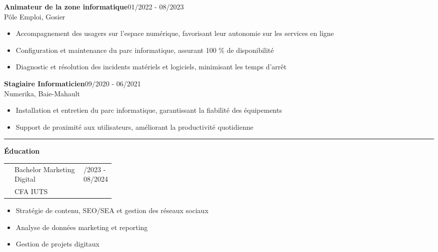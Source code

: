 \documentclass[a4paper]{article}
\renewcommand{\colorbox}[2]{#2}%
\newcommand{\fullrule}{\hspace{-1.5cm}\rule{\paperwidth}{0.4pt}}
\newcommand{\cvsection}[1]{%
  \vspace{6pt}\textbf{\Large #1}\par\vspace{2pt}}
\begin{document}
\vspace{3mm}

\colorbox{maincolor}{%
  \begin{minipage}{\linewidth}
    \noindent
    \textbf{Animateur de la zone informatique}\hfill 01/2022 - 08/2023\\
    Pôle Emploi, Gosier\\[-0.3em]
    \begin{itemize}[leftmargin=*]
      \item Accompagnement des usagers sur l’espace numérique, favorisant leur autonomie sur les services en ligne \item Configuration et maintenance du parc informatique, assurant 100 \% de disponibilité \item Diagnostic et résolution des incidents matériels et logiciels, minimisant les temps d’arrêt
    \end{itemize}
  \end{minipage}}

\vspace{3mm}

\colorbox{maincolor}{%
  \begin{minipage}{\linewidth}
    \noindent
    \textbf{Stagiaire Informaticien}\hfill 09/2020 - 06/2021\\
    Numerika, Baie-Mahault\\[-0.3em]
    \begin{itemize}[leftmargin=*]
      \item Installation et entretien du parc informatique, garantissant la fiabilité des équipements \item Support de proximité aux utilisateurs, améliorant la productivité quotidienne
    \end{itemize}
  \end{minipage}}

\medskip\fullrule

\cvsection{Éducation}
\hspace*{1.3cm}%

\begin{tabularx}{\linewidth}{@{}c  >{\RaggedRight\arraybackslash}X
                             >{\raggedleft\arraybackslash}p{0.25\linewidth}@{}}
\textcolor{sidetext}{} &
Bachelor Marketing Digital &
09/2023 - 08/2024 \\
& CFA IUTS & \\   %
\end{tabularx}
\begin{itemize}[leftmargin=*]
  \item Stratégie de contenu, SEO/SEA et gestion des réseaux sociaux
  \item Analyse de données marketing et reporting
  \item Gestion de projets digitaux
\end{itemize}
\vspace{3mm}
\end{document}
